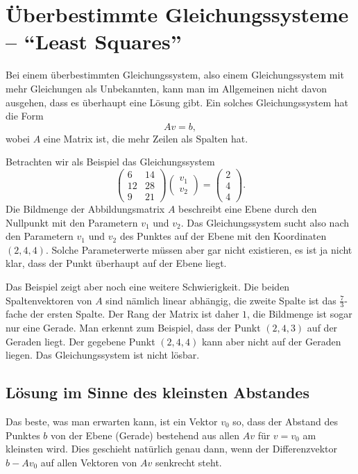 %
%
%
\section{Überbestimmte Gleichungssysteme -- ``Least Squares''%
\label{section:ueberbestimmt}}
Bei einem überbestimmten Gleichungssystem, also einem Gleichungssystem
mit mehr Gleichungen als Unbekannten, kann man im Allgemeinen nicht davon
ausgehen, dass es überhaupt eine Lösung gibt.
Ein solches Gleichungssystem hat die Form
\[
A v= b,
\]
wobei $A$ eine Matrix ist, die mehr Zeilen als Spalten hat.

Betrachten wir als Beispiel das Gleichungssystem
\[
\begin{pmatrix}
 6&14\\
12&28\\
 9&21
\end{pmatrix}
\begin{pmatrix}v_1\\v_2\end{pmatrix}
=
\begin{pmatrix}2\\4\\4\end{pmatrix}.
\]
Die Bildmenge der Abbildungsmatrix $A$ beschreibt eine Ebene durch
den Nullpunkt mit den Parametern $v_1$ und $v_2$.
Das Gleichungssystem sucht also nach den Parametern $v_1$ und $v_2$
des Punktes auf der Ebene mit den Koordinaten $(2,4,4)$.
Solche Parameterwerte müssen aber gar nicht existieren, es ist
ja nicht klar, dass der Punkt überhaupt auf der Ebene liegt.

Das Beispiel zeigt aber noch eine weitere Schwierigkeit.
Die beiden Spaltenvektoren von $A$ sind nämlich linear abhängig,
die zweite Spalte ist das $\frac{7}{3}$-fache der ersten Spalte.
Der Rang der Matrix ist daher $1$, die Bildmenge ist sogar nur
eine Gerade.
Man erkennt zum Beispiel, dass der Punkt $(2,4,3)$ auf der Geraden
liegt.
Der gegebene Punkt $(2,4,4)$ kann aber nicht auf der Geraden liegen.
Das Gleichungssystem ist nicht lösbar.

%
%
\subsection{Lösung im Sinne des kleinsten Abstandes}
Das beste, was man erwarten kann, ist ein Vektor $v_0$ so, dass
der Abstand des Punktes $ b$ von der Ebene (Gerade) bestehend
aus allen $Av$ für $v=v_0$ am kleinsten wird.
Dies geschieht natürlich genau dann, wenn der Differenzvektor $b-Av_0$ auf
allen Vektoren von $Av$ senkrecht steht.

